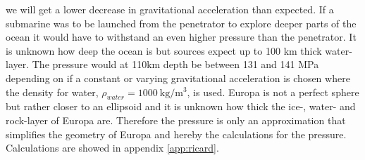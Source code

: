 we will get a lower decrease in gravitational acceleration than expected. If a submarine was to be launched from the penetrator to explore deeper parts of the ocean it would have to withstand an even higher pressure than the penetrator. It is unknown how deep the ocean is but sources expect up to 100 km thick water-layer. The pressure would at 110km depth be between 131 and 141 MPa depending on if a constant or varying gravitational acceleration is chosen where the density for water, $\rho_{water} = \SI{1000}{\kilo\gram\per\cubic\metre}$, is used. Europa is not a perfect sphere but rather closer to an ellipsoid and it is unknown how thick the ice-, water- and rock-layer of Europa are. Therefore the pressure is only an approximation that simplifies the geometry of Europa and hereby the calculations for the pressure. Calculations are showed in appendix \ref{app:ricard}.


